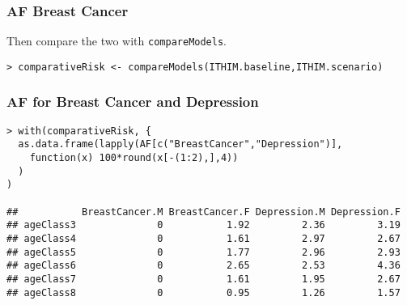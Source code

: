 \documentclass[handout,13pt,compress,c]{beamer}
\begin{document}
\begin{frame}[fragile]
\frametitle{AF Breast Cancer}
Then compare the two with \texttt{compareModels}.
\begin{semiverbatim}
\begin{lstlisting}
> comparativeRisk <- compareModels(ITHIM.baseline,ITHIM.scenario)
\end{lstlisting}
\end{semiverbatim}
\end{frame}
\begin{frame}[fragile]
\frametitle{AF for Breast Cancer and Depression}
\begin{semiverbatim}
\begin{lstlisting}
> with(comparativeRisk, {
  as.data.frame(lapply(AF[c("BreastCancer","Depression")],
    function(x) 100*round(x[-(1:2),],4))
  )
)

##           BreastCancer.M BreastCancer.F Depression.M Depression.F
## ageClass3              0           1.92         2.36         3.19
## ageClass4              0           1.61         2.97         2.67
## ageClass5              0           1.77         2.96         2.93
## ageClass6              0           2.65         2.53         4.36
## ageClass7              0           1.61         1.95         2.67
## ageClass8              0           0.95         1.26         1.57
\end{lstlisting}
\end{semiverbatim}
\end{frame}
\end{document}
